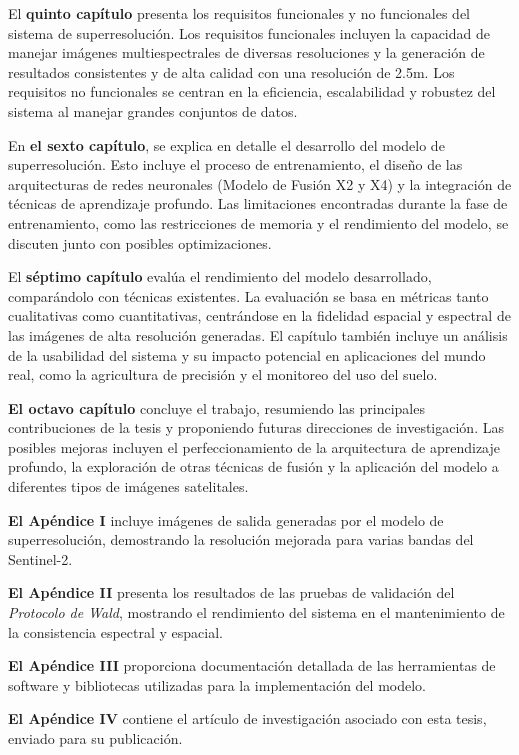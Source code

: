 El \textbf{quinto capítulo} presenta los requisitos funcionales y no funcionales del sistema de superresolución. Los requisitos funcionales incluyen la capacidad de manejar imágenes multiespectrales de diversas resoluciones y la generación de resultados consistentes y de alta calidad con una resolución de 2.5m. Los requisitos no funcionales se centran en la eficiencia, escalabilidad y robustez del sistema al manejar grandes conjuntos de datos.

En \textbf{el sexto capítulo}, se explica en detalle el desarrollo del modelo de superresolución. Esto incluye el proceso de entrenamiento, el diseño de las arquitecturas de redes neuronales (Modelo de Fusión X2 y X4) y la integración de técnicas de aprendizaje profundo. Las limitaciones encontradas durante la fase de entrenamiento, como las restricciones de memoria y el rendimiento del modelo, se discuten junto con posibles optimizaciones.

El \textbf{séptimo capítulo} evalúa el rendimiento del modelo desarrollado, comparándolo con técnicas existentes. La evaluación se basa en métricas tanto cualitativas como cuantitativas, centrándose en la fidelidad espacial y espectral de las imágenes de alta resolución generadas. El capítulo también incluye un análisis de la usabilidad del sistema y su impacto potencial en aplicaciones del mundo real, como la agricultura de precisión y el monitoreo del uso del suelo.

\textbf{El octavo capítulo} concluye el trabajo, resumiendo las principales contribuciones de la tesis y proponiendo futuras direcciones de investigación. Las posibles mejoras incluyen el perfeccionamiento de la arquitectura de aprendizaje profundo, la exploración de otras técnicas de fusión y la aplicación del modelo a diferentes tipos de imágenes satelitales.

\textbf{El Apéndice I} incluye imágenes de salida generadas por el modelo de superresolución, demostrando la resolución mejorada para varias bandas del Sentinel-2.

\textbf{El Apéndice II} presenta los resultados de las pruebas de validación del \textit{Protocolo de Wald}, mostrando el rendimiento del sistema en el mantenimiento de la consistencia espectral y espacial.

\textbf{El Apéndice III} proporciona documentación detallada de las herramientas de software y bibliotecas utilizadas para la implementación del modelo.

\textbf{El Apéndice IV} contiene el artículo de investigación asociado con esta tesis, enviado para su publicación.

